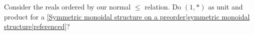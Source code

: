 
Consider the reals ordered by our normal $\leq$ relation. Do $(1,*)$ as unit and product for a \ref{Symmetric monoidal structure on a preorder|symmetric monoidal structure|referenced}?